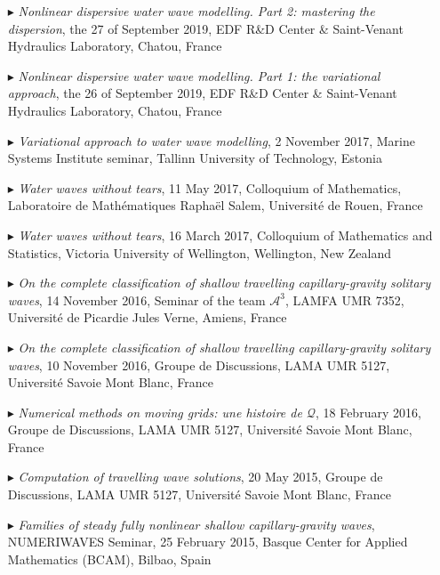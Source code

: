 \begin{itemize}
  \item[$\blacktriangleright$] \textit{Nonlinear dispersive water wave modelling. Part 2: mastering the dispersion}, the 27 of September 2019, EDF R\&D Center \& Saint-Venant Hydraulics Laboratory, Chatou, France

  \item[$\blacktriangleright$] \textit{Nonlinear dispersive water wave modelling. Part 1: the variational approach}, the 26 of September 2019, EDF R\&D Center \& Saint-Venant Hydraulics Laboratory, Chatou, France

  \item[$\blacktriangleright$] \textit{Variational approach to water wave modelling}, 2 November 2017, Marine Systems Institute seminar, Tallinn University of Technology, Estonia

  \item[$\blacktriangleright$] \textit{Water waves without tears}, 11 May 2017, Colloquium of Mathematics, Laboratoire de Math\'ematiques Rapha\"el Salem, Universit\'e de Rouen, France

  \item[$\blacktriangleright$] \textit{Water waves without tears}, 16 March 2017, Colloquium of Mathematics and Statistics, Victoria University of Wellington, Wellington, New Zealand

  \item[$\blacktriangleright$] \textit{On the complete classification of shallow travelling capillary-gravity solitary waves}, 14 November 2016, Seminar of the team $\mathcal{A}^3$, LAMFA UMR 7352, Universit\'e de Picardie Jules Verne, Amiens, France

  \item[$\blacktriangleright$] \textit{On the complete classification of shallow travelling capillary-gravity solitary waves}, 10 November 2016, Groupe de Discussions, LAMA UMR 5127, Universit\'e Savoie Mont Blanc, France

  \item[$\blacktriangleright$] \textit{Numerical methods on moving grids: une histoire de $\mathcal{Q}$}, 18 February 2016, Groupe de Discussions, LAMA UMR 5127, Universit\'e Savoie Mont Blanc, France

  \item[$\blacktriangleright$] \textit{Computation of travelling wave solutions}, 20 May 2015, Groupe de Discussions, LAMA UMR 5127, Universit\'e Savoie Mont Blanc, France

  \item[$\blacktriangleright$] \textit{Families of steady fully nonlinear shallow capillary-gravity waves}, NUMERIWAVES Seminar, 25 February 2015, Basque Center for Applied Mathematics (BCAM), Bilbao, Spain


\end{itemize}
